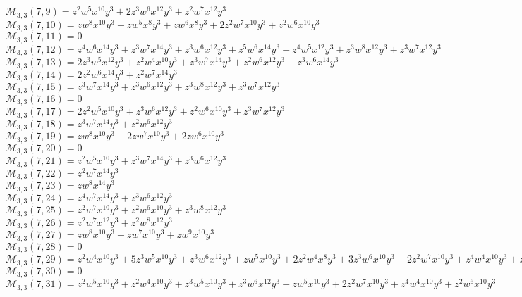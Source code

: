 $\mathcal{M}_{3,3}(7,9)=z^2w^5x^{10}y^3+2z^3w^6x^{12}y^3+z^2w^7x^{12}y^3$\\
$\mathcal{M}_{3,3}(7,10)=zw^8x^{10}y^3+zw^5x^8y^3+zw^6x^8y^3+2z^2w^7x^{10}y^3+z^2w^6x^{10}y^3$\\
$\mathcal{M}_{3,3}(7,11)=0$\\
$\mathcal{M}_{3,3}(7,12)=z^4w^6x^{14}y^3+z^3w^7x^{14}y^3+z^3w^6x^{12}y^3+z^5w^6x^{14}y^3+z^4w^5x^{12}y^3+z^3w^8x^{12}y^3+z^3w^7x^{12}y^3$\\
$\mathcal{M}_{3,3}(7,13)=2z^3w^5x^{12}y^3+z^2w^4x^{10}y^3+z^3w^7x^{14}y^3+z^2w^6x^{12}y^3+z^3w^6x^{14}y^3$\\
$\mathcal{M}_{3,3}(7,14)=2z^2w^6x^{14}y^3+z^2w^7x^{14}y^3$\\
$\mathcal{M}_{3,3}(7,15)=z^3w^7x^{14}y^3+z^3w^6x^{12}y^3+z^3w^8x^{12}y^3+z^3w^7x^{12}y^3$\\
$\mathcal{M}_{3,3}(7,16)=0$\\
$\mathcal{M}_{3,3}(7,17)=2z^2w^5x^{10}y^3+z^3w^6x^{12}y^3+z^2w^6x^{10}y^3+z^3w^7x^{12}y^3$\\
$\mathcal{M}_{3,3}(7,18)=z^3w^7x^{14}y^3+z^2w^6x^{12}y^3$\\
$\mathcal{M}_{3,3}(7,19)=zw^8x^{10}y^3+2zw^7x^{10}y^3+2zw^6x^{10}y^3$\\
$\mathcal{M}_{3,3}(7,20)=0$\\
$\mathcal{M}_{3,3}(7,21)=z^2w^5x^{10}y^3+z^3w^7x^{14}y^3+z^3w^6x^{12}y^3$\\
$\mathcal{M}_{3,3}(7,22)=z^2w^7x^{14}y^3$\\
$\mathcal{M}_{3,3}(7,23)=zw^8x^{14}y^3$\\
$\mathcal{M}_{3,3}(7,24)=z^4w^7x^{14}y^3+z^3w^6x^{12}y^3$\\
$\mathcal{M}_{3,3}(7,25)=z^2w^7x^{10}y^3+z^2w^6x^{10}y^3+z^3w^8x^{12}y^3$\\
$\mathcal{M}_{3,3}(7,26)=z^2w^7x^{12}y^3+z^2w^8x^{12}y^3$\\
$\mathcal{M}_{3,3}(7,27)=zw^8x^{10}y^3+zw^7x^{10}y^3+zw^9x^{10}y^3$\\
$\mathcal{M}_{3,3}(7,28)=0$\\
$\mathcal{M}_{3,3}(7,29)=z^2w^4x^{10}y^3+5z^3w^5x^{10}y^3+z^3w^6x^{12}y^3+zw^5x^{10}y^3+2z^2w^4x^8y^3+3z^3w^6x^{10}y^3+2z^2w^7x^{10}y^3+z^4w^4x^{10}y^3+z^2w^5x^8y^3$\\
$\mathcal{M}_{3,3}(7,30)=0$\\
$\mathcal{M}_{3,3}(7,31)=z^2w^5x^{10}y^3+z^2w^4x^{10}y^3+z^3w^5x^{10}y^3+z^3w^6x^{12}y^3+zw^5x^{10}y^3+2z^2w^7x^{10}y^3+z^4w^4x^{10}y^3+z^2w^6x^{10}y^3$\\
